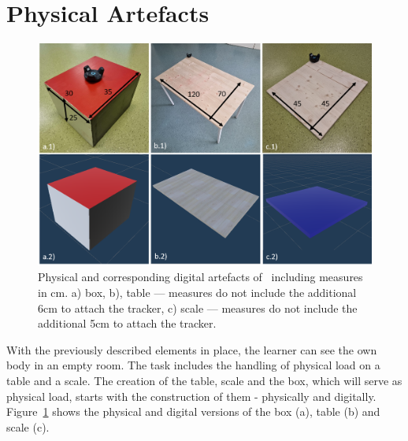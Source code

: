 \section{Physical Artefacts}
\label{sec:artefacts}
\begin{figure}[H]
	\centering
	\includegraphics[width=\textwidth]{figures/artefacts.png}	
	\caption[Artefacts of \exgo]{Physical and corresponding digital artefacts of \exgo\ including measures in cm. a) box, b), table --- measures do not include the additional 6cm to attach the tracker, c) scale --- measures do not include the additional 5cm to attach the tracker.}
	\label{fig:artefacts}
\end{figure}
With the previously described elements in place, the learner can see the own body in an empty room. The task includes the handling of physical load on a table and a scale. The creation of the table, scale and the box, which will serve as physical load, starts with the construction of them - physically and digitally. Figure~\ref{fig:artefacts} shows the physical and digital versions of the box (a), table (b) and scale (c).\\
